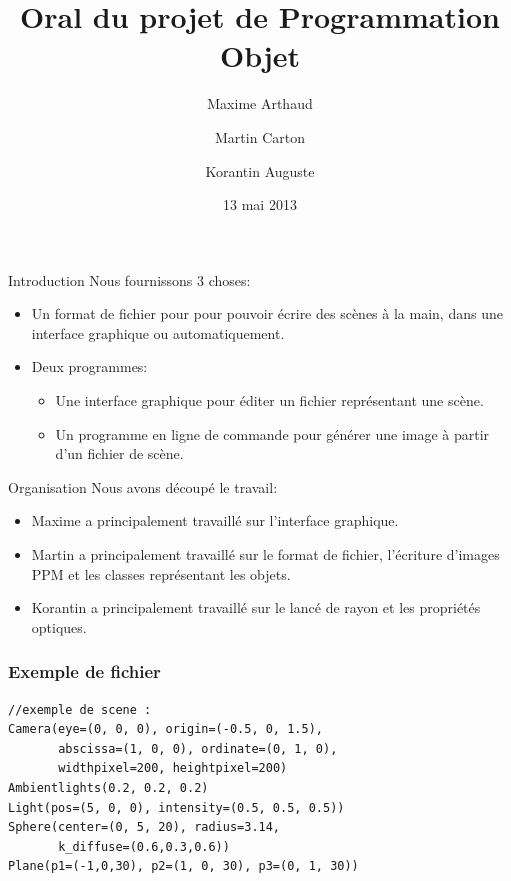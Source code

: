 \documentclass{beamer}
\title{Oral du projet de Programmation Objet}
\author{Maxime Arthaud \and Martin Carton \and Korantin Auguste}
\date{13 mai 2013}
\begin{document}
  \begin{frame}
    \titlepage
  \end{frame}

  \begin{frame}{Introduction}
    Nous fournissons 3 choses:
    \begin{itemize}
      \item Un format de fichier pour pour pouvoir écrire des scènes à la main,
        dans une interface graphique ou automatiquement.

      \item
        Deux programmes:
        \begin{itemize}
          \item Une interface graphique pour éditer un fichier représentant une
            scène.
          \item Un programme en ligne de commande pour générer une image à
            partir d'un fichier de scène.
        \end{itemize}
    \end{itemize}
  \end{frame}

  \begin{frame}{Organisation}
    Nous avons découpé le travail:
    \begin{itemize}
      \item Maxime a principalement travaillé sur l'interface graphique.
      \item Martin a principalement travaillé sur le format de fichier,
        l'écriture d'images PPM et les classes représentant les objets.
      \item Korantin a principalement travaillé sur le lancé de rayon et les
        propriétés optiques.
    \end{itemize}
  \end{frame}

\begin{frame}[fragile]
\frametitle{Exemple de fichier}

\begin{lstlisting}
//exemple de scene :
Camera(eye=(0, 0, 0), origin=(-0.5, 0, 1.5),
       abscissa=(1, 0, 0), ordinate=(0, 1, 0),
       widthpixel=200, heightpixel=200)
Ambientlights(0.2, 0.2, 0.2)
Light(pos=(5, 0, 0), intensity=(0.5, 0.5, 0.5))
Sphere(center=(0, 5, 20), radius=3.14,
       k_diffuse=(0.6,0.3,0.6))
Plane(p1=(-1,0,30), p2=(1, 0, 30), p3=(0, 1, 30))
\end{lstlisting}
\end{frame}
\end{document}
